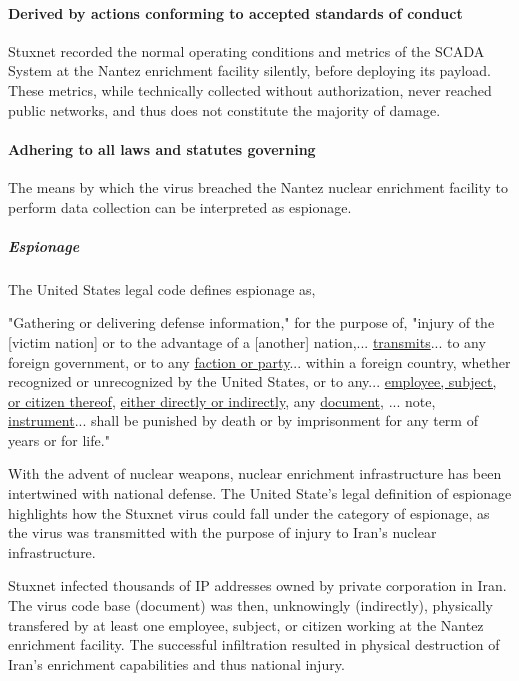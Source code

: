 \documentclass[12pt]{article}
\begin{document}
\begin{multicols}{2}
\paragraph{Derived by actions conforming to accepted standards of conduct}

Stuxnet recorded the normal operating conditions and metrics of the SCADA System at the Nantez enrichment facility silently, before deploying its payload. These metrics, while technically collected without authorization, never reached public networks, and thus does not constitute the majority of damage.

\paragraph{Adhering to all laws and statutes governing}

The means by which the virus breached the Nantez nuclear enrichment facility to perform data collection can be interpreted as espionage.

\subparagraph{Espionage}

The United States legal code defines espionage as,

\begin{displayquote}
"Gathering or delivering defense information," for the purpose of, "injury of the [victim nation] or to the advantage of a [another] nation,... \ul{transmits}... to any foreign government, or to any \ul{faction or party}... within a foreign country, whether recognized or unrecognized by the United States, or to any... \ul{employee, subject, or citizen thereof}, \ul{either directly or indirectly}, any \ul{document}, ... note, \ul{instrument}... shall be punished by death or by imprisonment for any term of years or for life."\cite{USEspionageLegalDefinition}
\end{displayquote}

With the advent of nuclear weapons, nuclear enrichment infrastructure has been intertwined with national defense. The United State's legal definition of espionage highlights how the Stuxnet virus could fall under the category of espionage, as the virus was transmitted with the purpose of injury to Iran's nuclear infrastructure.

Stuxnet infected thousands of IP addresses owned by private corporation in Iran. The virus code base (document) was then, unknowingly (indirectly), physically transfered by at least one employee, subject, or citizen working at the Nantez enrichment facility. The successful infiltration resulted in physical destruction of Iran's enrichment capabilities and thus national injury.


\end{multicols}
\end{document}
